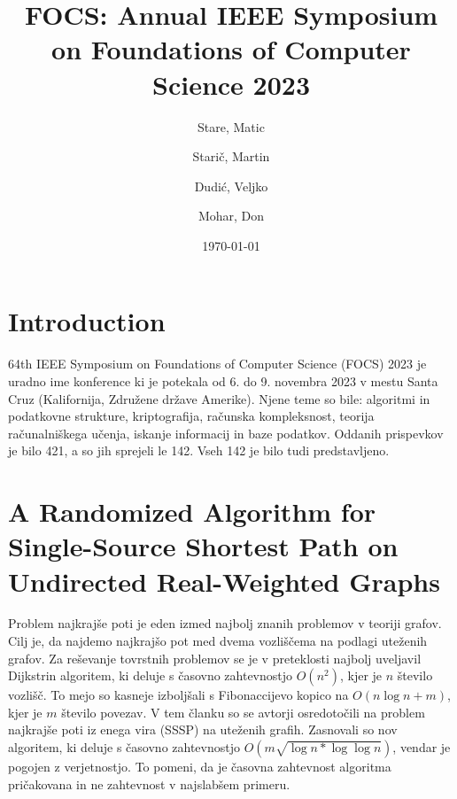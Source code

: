 \documentclass{article}
\title{FOCS: Annual IEEE Symposium on Foundations of Computer Science 2023}
\author{
  Stare, Matic\\
  \and
  Starič, Martin\\
  \and
  Dudić, Veljko\\
  \and
  Mohar, Don
}
\date{\today}
\begin{document}
\maketitle

\tableofcontents
\newpage

\section{Introduction}
64th IEEE Symposium on Foundations of Computer Science (FOCS) 2023 je uradno ime konference ki je potekala od 6. do 9. novembra 2023 v mestu Santa Cruz (Kalifornija, Združene države Amerike). Njene teme so bile: algoritmi in podatkovne strukture, kriptografija, računska kompleksnost, teorija računalniškega učenja, iskanje informacij in baze podatkov. Oddanih prispevkov je bilo 421, a so jih sprejeli le 142. Vseh 142 je bilo tudi predstavljeno.

\section{A Randomized Algorithm for Single-Source Shortest Path on Undirected Real-Weighted Graphs}

Problem najkrajše poti je eden izmed najbolj znanih problemov v teoriji grafov. Cilj je, da najdemo najkrajšo pot med dvema vozliščema na podlagi uteženih grafov. Za reševanje tovrstnih problemov se je v preteklosti najbolj uveljavil Dijkstrin algoritem, ki deluje s časovno zahtevnostjo $O(n^2)$, kjer je $n$ število vozlišč. To mejo so kasneje izboljšali s Fibonaccijevo kopico na $O(n \log n + m)$, kjer je $m$ število povezav. V tem članku so se avtorji osredotočili na problem najkrajše poti iz enega vira (SSSP) na uteženih grafih. Zasnovali so nov algoritem, ki deluje s časovno zahtevnostjo $O(m \sqrt{\log n * \log \log n})$, vendar je pogojen z verjetnostjo. To pomeni, da je časovna zahtevnost algoritma pričakovana in ne zahtevnost v najslabšem primeru. 
\end{document}
